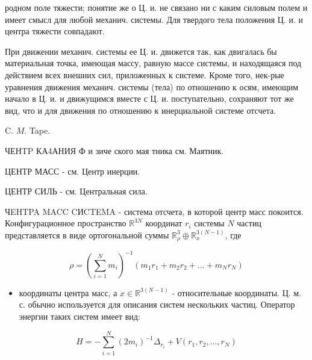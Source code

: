 \documentclass[10pt]{article}
\begin{document}
родном поле тяжести; понятие же о Ц. и. не связано ни с каким силовым полем и имеет смысл для любой механич. системы. Для твердого тела положения Ц. и. и центра тяжести совпадают.



При движении механич. системы ее Ц. и. движется так, как двигалась бы материальная точка, имеющая массу, равную массе системы, и находящаяся под действием всех внешних сил, приложенных к системе. Кроме того, нек-рые уравнения движения механич. системы (тела) по отношению к осям, имеющим начало в Ц. и. и движущимся вместе с Ц. и. поступательно, сохраняют тот же вид, что и для движения по отношению к инерциальной системе отсчета.



C. $M$. Tape.



ЧЕНTP КА4АНИЯ Ф и зиче ского мая тника см. Маятник.



ЦЕНТР МАСС - см. Центр инерции.



ЦЕНТР СИЛЬ - см. Центральная сила.



ЧEHTPA MACC CИCTEMA - система отсчета, в которой центр масс покоится. Конфигурационное пространство $\mathbb{R}^{3 N}$ координат $r_{i}$ системы $N$ частиц представляется в виде ортогональной суммы $\mathbb{R}_{\rho}^{3} \oplus \mathbb{R}_{x}^{3(N-1)}$, где



\[

\rho=\left(\sum_{i=1}^{N} m_{i}\right)^{-1}\left(m_{1} r_{1}+m_{2} r_{2}+\ldots+m_{N} r_{N}\right)

\]



\begin{itemize}

  \item координаты центра масс, а $x \in \mathbb{R}^{3(N-1)}$ - относительные координаты. Ц. м. с. обычно используется для описания систем нескольких частиц. Оператор энергии таких систем имеет вид:

\end{itemize}



\[

H=-\sum_{i=1}^{N}\left(2 m_{i}\right)^{-1} \Delta_{r_{i}}+V\left(r_{1}, r_{2}, \ldots, r_{N}\right)

\]
\end{document}
